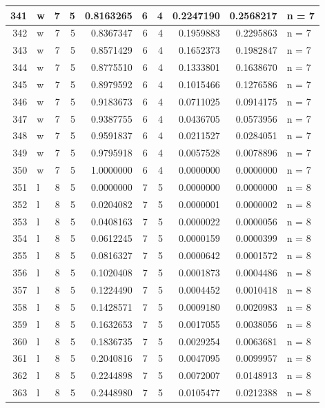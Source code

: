 \documentclass[
  letterpaper,
  DIV=11,
  numbers=noendperiod]{scrreprt}
\begin{document}
\begin{table}
\begin{tabular}[t]{r|l|r|r|r|r|r|r|r|l}
\hline
341 & w & 7 & 5 & 0.8163265 & 6 & 4 & 0.2247190 & 0.2568217 & n = 7\\
\hline
342 & w & 7 & 5 & 0.8367347 & 6 & 4 & 0.1959883 & 0.2295863 & n = 7\\
\hline
343 & w & 7 & 5 & 0.8571429 & 6 & 4 & 0.1652373 & 0.1982847 & n = 7\\
\hline
344 & w & 7 & 5 & 0.8775510 & 6 & 4 & 0.1333801 & 0.1638670 & n = 7\\
\hline
345 & w & 7 & 5 & 0.8979592 & 6 & 4 & 0.1015466 & 0.1276586 & n = 7\\
\hline
346 & w & 7 & 5 & 0.9183673 & 6 & 4 & 0.0711025 & 0.0914175 & n = 7\\
\hline
347 & w & 7 & 5 & 0.9387755 & 6 & 4 & 0.0436705 & 0.0573956 & n = 7\\
\hline
348 & w & 7 & 5 & 0.9591837 & 6 & 4 & 0.0211527 & 0.0284051 & n = 7\\
\hline
349 & w & 7 & 5 & 0.9795918 & 6 & 4 & 0.0057528 & 0.0078896 & n = 7\\
\hline
350 & w & 7 & 5 & 1.0000000 & 6 & 4 & 0.0000000 & 0.0000000 & n = 7\\
\hline
351 & l & 8 & 5 & 0.0000000 & 7 & 5 & 0.0000000 & 0.0000000 & n = 8\\
\hline
352 & l & 8 & 5 & 0.0204082 & 7 & 5 & 0.0000001 & 0.0000002 & n = 8\\
\hline
353 & l & 8 & 5 & 0.0408163 & 7 & 5 & 0.0000022 & 0.0000056 & n = 8\\
\hline
354 & l & 8 & 5 & 0.0612245 & 7 & 5 & 0.0000159 & 0.0000399 & n = 8\\
\hline
355 & l & 8 & 5 & 0.0816327 & 7 & 5 & 0.0000642 & 0.0001572 & n = 8\\
\hline
356 & l & 8 & 5 & 0.1020408 & 7 & 5 & 0.0001873 & 0.0004486 & n = 8\\
\hline
357 & l & 8 & 5 & 0.1224490 & 7 & 5 & 0.0004452 & 0.0010418 & n = 8\\
\hline
358 & l & 8 & 5 & 0.1428571 & 7 & 5 & 0.0009180 & 0.0020983 & n = 8\\
\hline
359 & l & 8 & 5 & 0.1632653 & 7 & 5 & 0.0017055 & 0.0038056 & n = 8\\
\hline
360 & l & 8 & 5 & 0.1836735 & 7 & 5 & 0.0029254 & 0.0063681 & n = 8\\
\hline
361 & l & 8 & 5 & 0.2040816 & 7 & 5 & 0.0047095 & 0.0099957 & n = 8\\
\hline
362 & l & 8 & 5 & 0.2244898 & 7 & 5 & 0.0072007 & 0.0148913 & n = 8\\
\hline
363 & l & 8 & 5 & 0.2448980 & 7 & 5 & 0.0105477 & 0.0212388 & n = 8\\

\end{tabular}
\end{table}
\end{document}
